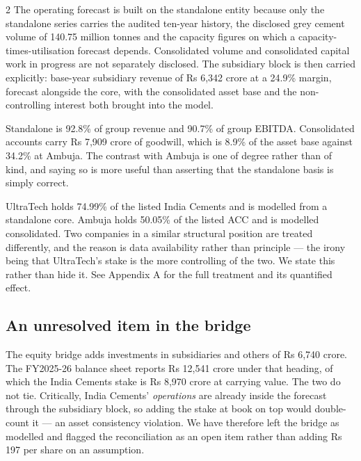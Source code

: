 \begin{paracol}{2}
The operating forecast is built on the standalone entity because only the standalone
series carries the audited ten-year history, the disclosed grey cement volume of
140.75 million tonnes and the capacity figures on which a capacity-times-utilisation
forecast depends. Consolidated volume and consolidated capital work in progress are
not separately disclosed. The subsidiary block is then carried explicitly: base-year
subsidiary revenue of Rs 6,342 crore at a 24.9\% margin, forecast alongside the core,
with the consolidated asset base and the non-controlling interest both brought into
the model.

\begin{okbox}
Standalone is 92.8\% of group revenue and 90.7\% of group EBITDA. Consolidated
accounts carry Rs 7,909 crore of goodwill, which is 8.9\% of the asset base against
34.2\% at Ambuja. The contrast with Ambuja is one of degree rather than of kind, and
saying so is more useful than asserting that the standalone basis is simply correct.
\end{okbox}

\begin{warnbox}
UltraTech holds 74.99\% of the listed India Cements and is modelled from a standalone
core. Ambuja holds 50.05\% of the listed ACC and is modelled consolidated. Two
companies in a similar structural position are treated differently, and the reason is
data availability rather than principle — the irony being that UltraTech's stake is
the more controlling of the two. We state this rather than hide it. See Appendix A
for the full treatment and its quantified effect.
\end{warnbox}

\subsection{An unresolved item in the bridge}

The equity bridge adds investments in subsidiaries and others of Rs 6,740 crore. The
FY2025-26 balance sheet reports Rs 12,541 crore under that heading, of which the India
Cements stake is Rs 8,970 crore at carrying value. The two do not tie. Critically,
India Cements' \emph{operations} are already inside the forecast through the
subsidiary block, so adding the stake at book on top would double-count it — an asset
consistency violation. We have therefore left the bridge as modelled and flagged the
reconciliation as an open item rather than adding Rs 197 per share on an assumption.


\end{paracol}
